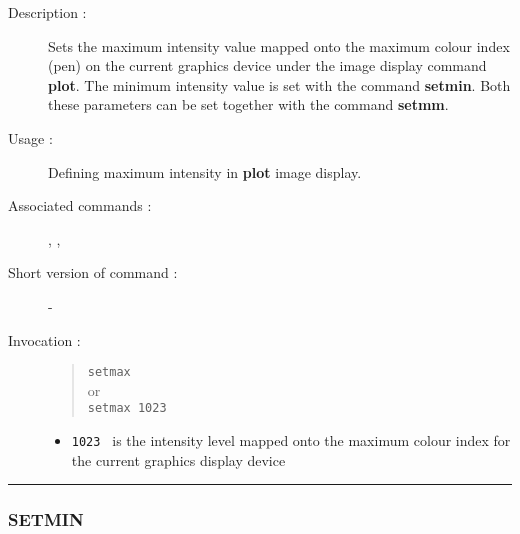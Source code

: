 \begin{description}

\item[Description :] Sets the maximum intensity value mapped onto the
maximum colour index (pen) on the current graphics device under the
image display command {\bf plot}.  The minimum intensity value is set
with the command {\bf setmin}.  Both these parameters can be set
together with the command {\bf setmm}.

\item[Usage :] Defining maximum intensity in {\bf plot} image display.

\item[Associated commands :] {\tt {}},
{\tt {}}, {\tt {}}

\item[Short version of command :] -
\item[Invocation :]

\begin{quote}{\tt  setmax }\\
or \\
{\tt setmax 1023 }
\end{quote}

\begin{itemize}

\item {\tt 1023 } is the intensity level mapped onto the maximum colour
 index for the current graphics display device
\end{itemize}

\end{description}

\hrule
\subsubsection*{\label{SETMIN}SETMIN}


